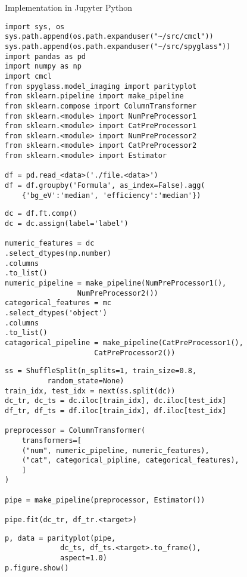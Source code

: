 \documentclass[10pt, compress]{beamer}
\begin{document}
\begin{frame}{Implementation in Jupyter Python}
\begin{lstlisting}
import sys, os
sys.path.append(os.path.expanduser("~/src/cmcl"))
sys.path.append(os.path.expanduser("~/src/spyglass"))
import pandas as pd
import numpy as np
import cmcl
from spyglass.model_imaging import parityplot
from sklearn.pipeline import make_pipeline
from sklearn.compose import ColumnTransformer
from sklearn.<module> import NumPreProcessor1
from sklearn.<module> import CatPreProcessor1
from sklearn.<module> import NumPreProcessor2
from sklearn.<module> import CatPreProcessor2
from sklearn.<module> import Estimator

df = pd.read_<data>('./file.<data>')
df = df.groupby('Formula', as_index=False).agg(
    {'bg_eV':'median', 'efficiency':'median'})
\end{lstlisting}

\begin{lstlisting}
dc = df.ft.comp()
dc = dc.assign(label='label')

numeric_features = dc
.select_dtypes(np.number)
.columns
.to_list()
numeric_pipeline = make_pipeline(NumPreProcessor1(),
				 NumPreProcessor2())
categorical_features = mc
.select_dtypes('object')
.columns
.to_list()
catagorical_pipeline = make_pipeline(CatPreProcessor1(),
				     CatPreProcessor2())
\end{lstlisting}

\begin{lstlisting}
ss = ShuffleSplit(n_splits=1, train_size=0.8,
		  random_state=None)
train_idx, test_idx = next(ss.split(dc))
dc_tr, dc_ts = dc.iloc[train_idx], dc.iloc[test_idx]
df_tr, df_ts = df.iloc[train_idx], df.iloc[test_idx]

preprocessor = ColumnTransformer(
    transformers=[
	("num", numeric_pipeline, numeric_features),
	("cat", categorical_pipline, categorical_features),
    ]
)

pipe = make_pipeline(preprocessor, Estimator())

pipe.fit(dc_tr, df_tr.<target>)
\end{lstlisting}

\begin{lstlisting}
p, data = parityplot(pipe,
		     dc_ts, df_ts.<target>.to_frame(),
		     aspect=1.0)
p.figure.show()
\end{lstlisting}
\end{frame}
\end{document}

